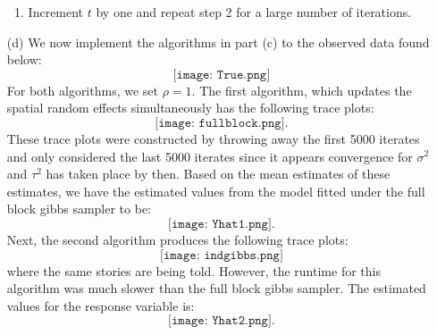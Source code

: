 \documentclass[11pt]{article}
\begin{document}
\begin{itemize}
\begin{enumerate}
\item Increment $t$ by one and repeat step 2 for a large number of iterations.
\end{enumerate}
\item[(d)]  We now implement the algorithms in part (c) to the observed data found below:
\[
\texttt{[image: True.png]}
\]
For both algorithms, we set $\rho = 1$.  The first algorithm, which updates the spatial random effects simultaneously has the following trace plots:
\[
\texttt{[image: fullblock.png]}.
\]
These trace plots were constructed by throwing away the first 5000 iterates and only considered the last 5000 iterates since it appears convergence for $\sigma^2$ and $\tau^2$ has taken place by then.  Based on the mean estimates of these estimates, we have the estimated values from the model fitted under the full block gibbs sampler to be:
\[
\texttt{[image: Yhat1.png]}.
\]
Next, the second algorithm produces the following trace plots:
\[
\texttt{[image: indgibbs.png]}
\]
where the same stories are being told.  However, the runtime for this algorithm was much slower than the full block gibbs sampler. The estimated values for the response variable is:
\[
\texttt{[image: Yhat2.png]}.
\]
\end{itemize}
\end{document}
